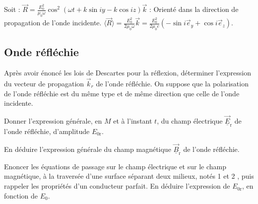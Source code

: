 \begin{quest}
{        Soit : $\vec{R}=\frac{E_0^2}{\mu_0 \omega} \cos ^2(\omega t+k \sin i y-k \cos i z) \vec{k}$ : Orienté dans la direction de propagation de l'onde incidente. $\langle\vec{R}\rangle=\frac{E_0^2}{2 \mu_0 \omega} \vec{k}=\frac{E_0^2}{2 \mu_0 c}\left(-\sin i \vec{e}_y+\cos i \vec{e}_z\right)$.
    }
    
\end{quest}
    \subsection{Onde réfléchie}
    \begin{quest}
        \item Après avoir énoncé les lois de Descartes pour la réflexion, déterminer l'expression du vecteur de propagation \(\Vec{k}_{r}\) de l'onde réfléchie. On suppose que la polarisation de l'onde réfléchie est du même type et de même direction que celle de l'onde incidente.
        \item Donner l'expression générale, en \(M\) et à l'instant \(t\), du champ électrique \(\underline{\Vec{E}}_{\mathrm{r}}\) de l'onde réfléchie, d'amplitude \(E_{0 \mathrm{r}}\).
        \item En déduire l'expression générale du champ magnétique \(\underline{\Vec{B}}_{\mathrm{r}}\) de l'onde réfléchie.
        \item Enoncer les équations de passage sur le champ électrique et sur le champ magnétique, à la traversée d'une surface séparant deux milieux, notés 1 et 2 , puis rappeler les propriétés d'un conducteur parfait. En déduire l'expression de \(E_{0 \mathrm{r}}\), en fonction de \(E_{0}\).
\end{quest}
